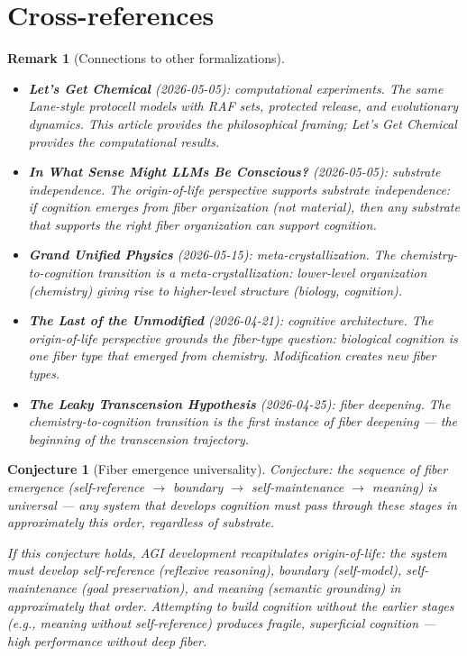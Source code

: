 \documentclass[11pt,a4paper]{article}
\newtheorem{conjecture}[definition]{Conjecture}
\newtheorem{remark}[definition]{Remark}
\begin{document}
\section{Cross-references}

\begin{remark}[Connections to other formalizations]
\begin{itemize}
\item \textbf{Let's Get Chemical} (2026-05-05): computational
  experiments. The same Lane-style protocell models with RAF sets,
  protected release, and evolutionary dynamics. This article provides
  the philosophical framing; Let's Get Chemical provides the
  computational results.
\item \textbf{In What Sense Might LLMs Be Conscious?} (2026-05-05):
  substrate independence. The origin-of-life perspective supports
  substrate independence: if cognition emerges from fiber organization
  (not material), then any substrate that supports the right fiber
  organization can support cognition.
\item \textbf{Grand Unified Physics} (2026-05-15): meta-crystallization.
  The chemistry-to-cognition transition is a meta-crystallization:
  lower-level organization (chemistry) giving rise to higher-level
  structure (biology, cognition).
\item \textbf{The Last of the Unmodified} (2026-04-21): cognitive
  architecture. The origin-of-life perspective grounds the
  fiber-type question: biological cognition is one fiber type that
  emerged from chemistry. Modification creates new fiber types.
\item \textbf{The Leaky Transcension Hypothesis} (2026-04-25):
  fiber deepening. The chemistry-to-cognition transition is the
  first instance of fiber deepening --- the beginning of the
  transcension trajectory.
\end{itemize}
\end{remark}

\begin{conjecture}[Fiber emergence universality]
Conjecture: the sequence of fiber emergence (self-reference $\to$
boundary $\to$ self-maintenance $\to$ meaning) is universal ---
any system that develops cognition must pass through these stages
in approximately this order, regardless of substrate.

If this conjecture holds, AGI development recapitulates origin-of-life:
the system must develop self-reference (reflexive reasoning), boundary
(self-model), self-maintenance (goal preservation), and meaning
(semantic grounding) in approximately that order. Attempting to build
cognition without the earlier stages (e.g., meaning without
self-reference) produces fragile, superficial cognition --- high
performance without deep fiber.
\end{conjecture}
\end{document}
